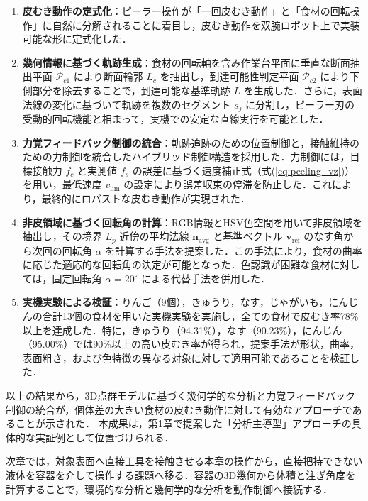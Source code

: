 \begin{enumerate}
  \item \textbf{皮むき動作の定式化}：ピーラー操作が「一回皮むき動作」と「食材の回転操作」に自然に分解されることに着目し，皮むき動作を双腕ロボット上で実装可能な形に定式化した．

  \item \textbf{幾何情報に基づく軌跡生成}：食材の回転軸を含み作業台平面に垂直な断面抽出平面 $\mathcal{P}_{c1}$ により断面輪郭 $L_c$ を抽出し，到達可能性判定平面 $\mathcal{P}_{c2}$ により下側部分を除去することで，到達可能な基準軌跡 $L$ を生成した．さらに，表面法線の変化に基づいて軌跡を複数のセグメント $s_j$ に分割し，ピーラー刃の受動的回転機能と相まって，実機での安定な直線実行を可能とした．

  \item \textbf{力覚フィードバック制御の統合}：軌跡追跡のための位置制御と，接触維持のための力制御を統合したハイブリッド制御構造を採用した．力制御には，目標接触力 $f_c$ と実測値 $f_s$ の誤差に基づく速度補正式（式(\ref{eq:peeling_vz})）を用い，最低速度 $v_{\mathrm{lim}}$ の設定により誤差収束の停滞を防止した．これにより，最終的にロバストな皮むき動作が実現された．

  \item \textbf{非皮領域に基づく回転角の計算}：RGB情報とHSV色空間を用いて非皮領域を抽出し，その境界 $L_p$ 近傍の平均法線 $\mathbf{n}_{\mathrm{avg}}$ と基準ベクトル $\mathbf{v}_{\mathrm{ref}}$ のなす角から次回の回転角 $\alpha$ を計算する手法を提案した．この手法により，食材の曲率に応じた適応的な回転角の決定が可能となった．色認識が困難な食材に対しては，固定回転角 $\alpha = 20^\circ$ による代替手法を併用した．

  \item \textbf{実機実験による検証}：りんご（9個），きゅうり，なす，じゃがいも，にんじんの合計13個の食材を用いた実機実験を実施し，全ての食材で皮むき率78\%以上を達成した．特に，きゅうり（94.31\%），なす（90.23\%），にんじん（95.00\%）では90\%以上の高い皮むき率が得られ，提案手法が形状，曲率，表面粗さ，および色特徴の異なる対象に対して適用可能であることを検証した．
\end{enumerate}

以上の結果から，3D点群モデルに基づく幾何学的な分析と力覚フィードバック制御の統合が，個体差の大きい食材の皮むき動作に対して有効なアプローチであることが示された．
本成果は，第1章で提案した「分析主導型」アプローチの具体的な実証例として位置づけられる．

次章では，対象表面へ直接工具を接触させる本章の操作から，直接把持できない液体を容器を介して操作する課題へ移る．容器の3D幾何から体積と注ぎ角度を計算することで，環境的な分析と幾何学的な分析を動作制御へ接続する．